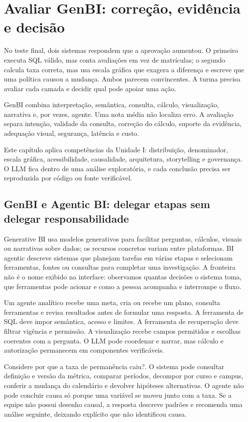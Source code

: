 \chapter{Avaliar GenBI: correção, evidência e decisão}

No teste final, dois sistemas respondem que a aprovação aumentou. O primeiro executa SQL válido, mas conta avaliações em vez de matrículas; o segundo calcula taxa correta, mas usa escala gráfica que exagera a diferença e escreve que uma política causou a mudança. Ambos parecem convincentes. A turma precisa avaliar cada camada e decidir qual pode apoiar uma ação.

GenBI combina interpretação, semântica, consulta, cálculo, visualização, narrativa e, por vezes, agente. Uma nota média não localiza erro. A avaliação separa intenção, validade da consulta, correção do cálculo, suporte da evidência, adequação visual, segurança, latência e custo.

Este capítulo aplica competências da Unidade I: distribuição, denominador, escala gráfica, acessibilidade, causalidade, arquitetura, storytelling e governança. O LLM fica dentro de uma análise exploratória, e cada conclusão precisa ser reproduzida por código ou fonte verificável.

\section{GenBI e Agentic BI: delegar etapas sem delegar responsabilidade}

Generative BI usa modelos generativos para facilitar perguntas, cálculos, visuais ou narrativas sobre dados; os recursos concretos variam entre plataformas. BI agentic descreve sistemas que planejam tarefas em várias etapas e selecionam ferramentas, fontes ou consultas para completar uma investigação. A fronteira não é o nome exibido na interface: observamos quantas decisões o sistema toma, que ferramentas pode acionar e como a pessoa acompanha e interrompe o fluxo.

Um agente analítico recebe uma meta, cria ou recebe um plano, consulta ferramentas e revisa resultados antes de formular uma resposta. A ferramenta de SQL deve impor semântica, acesso e limites. A ferramenta de recuperação deve filtrar vigência e permissão. A visualização recebe campos permitidos e escolhas coerentes com a pergunta. O LLM pode coordenar e narrar, mas cálculo e autorização permanecem em componentes verificáveis.

Considere por que a taxa de permanência caiu?. O sistema pode consultar definição e versão da métrica, comparar períodos, decompor por curso e campus, conferir a mudança do calendário e devolver hipóteses alternativas. O agente não pode concluir causa só porque uma variável se moveu junto com a taxa. Se a equipe não possui desenho causal, a resposta descreve padrões e recomenda uma análise seguinte, deixando explícito que não identificou causa.

